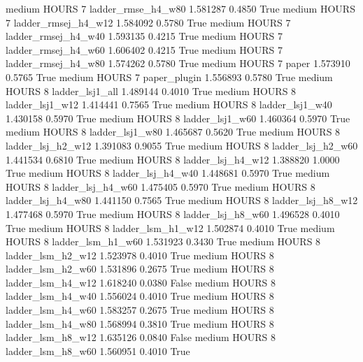     medium    HOURS                 7  ladder_rmse_h4_w80   1.581287      0.4850    True
    medium    HOURS                 7 ladder_rmsej_h4_w12   1.584092      0.5780    True
    medium    HOURS                 7 ladder_rmsej_h4_w40   1.593135      0.4215    True
    medium    HOURS                 7 ladder_rmsej_h4_w60   1.606402      0.4215    True
    medium    HOURS                 7 ladder_rmsej_h4_w80   1.574262      0.5780    True
    medium    HOURS                 7               paper   1.573910      0.5765    True
    medium    HOURS                 7        paper_plugin   1.556893      0.5780    True
    medium    HOURS                 8     ladder_lsj1_all   1.489144      0.4010    True
    medium    HOURS                 8     ladder_lsj1_w12   1.414441      0.7565    True
    medium    HOURS                 8     ladder_lsj1_w40   1.430158      0.5970    True
    medium    HOURS                 8     ladder_lsj1_w60   1.460364      0.5970    True
    medium    HOURS                 8     ladder_lsj1_w80   1.465687      0.5620    True
    medium    HOURS                 8   ladder_lsj_h2_w12   1.391083      0.9055    True
    medium    HOURS                 8   ladder_lsj_h2_w60   1.441534      0.6810    True
    medium    HOURS                 8   ladder_lsj_h4_w12   1.388820      1.0000    True
    medium    HOURS                 8   ladder_lsj_h4_w40   1.448681      0.5970    True
    medium    HOURS                 8   ladder_lsj_h4_w60   1.475405      0.5970    True
    medium    HOURS                 8   ladder_lsj_h4_w80   1.441150      0.7565    True
    medium    HOURS                 8   ladder_lsj_h8_w12   1.477468      0.5970    True
    medium    HOURS                 8   ladder_lsj_h8_w60   1.496528      0.4010    True
    medium    HOURS                 8   ladder_lsm_h1_w12   1.502874      0.4010    True
    medium    HOURS                 8   ladder_lsm_h1_w60   1.531923      0.3430    True
    medium    HOURS                 8   ladder_lsm_h2_w12   1.523978      0.4010    True
    medium    HOURS                 8   ladder_lsm_h2_w60   1.531896      0.2675    True
    medium    HOURS                 8   ladder_lsm_h4_w12   1.618240      0.0380   False
    medium    HOURS                 8   ladder_lsm_h4_w40   1.556024      0.4010    True
    medium    HOURS                 8   ladder_lsm_h4_w60   1.583257      0.2675    True
    medium    HOURS                 8   ladder_lsm_h4_w80   1.568994      0.3810    True
    medium    HOURS                 8   ladder_lsm_h8_w12   1.635126      0.0840   False
    medium    HOURS                 8   ladder_lsm_h8_w60   1.560951      0.4010    True
